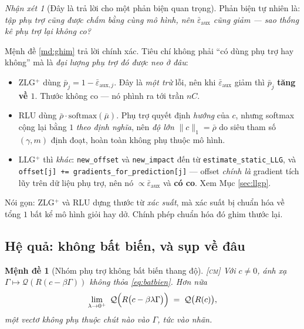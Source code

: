 \documentclass[11pt,a4paper]{article}
\newtheorem{menhde}[dinhly]{Mệnh đề}
\theoremstyle{remark}
\newtheorem{nhanxet}[dinhly]{Nhận xét}
\newcommand{\quant}{\mathcal{Q}}
\newcommand{\epsaux}{\bar\varepsilon_{\mathrm{aux}}}
\newcommand{\code}[1]{\texttt{\small #1}}
\begin{document}
\begin{nhanxet}[Đây là trả lời cho một phản biện quan trọng]
\label{nx:phanbien}
Phản biện tự nhiên là: \emph{tập phụ trợ cũng được chấm bằng cùng mô hình, nên
$\epsaux$ cũng giảm --- sao thống kê phụ trợ lại không co?}

Mệnh đề \ref{md:ghim} trả lời chính xác. Tiêu chí không phải ``có dùng phụ
trợ hay không'' mà là \emph{đại lượng phụ trợ đó được neo ở đâu}:

\begin{itemize}
\item ZLG$^+$ dùng $\bar p_j=1-\bar\varepsilon_{\mathrm{aux},j}$. Đây là
  \emph{một trừ} lỗi, nên khi $\epsaux$ giảm thì $\bar p_j$ \textbf{tăng về
  $1$}. Thước không co --- nó phình ra tới trần $nC$.
\item RLU dùng $\bar\rho\cdot\mathrm{softmax}(\bar\mu)$. Phụ trợ quyết định
  \emph{hướng} của $c$, nhưng softmax cộng lại bằng $1$ \emph{theo định
  nghĩa}, nên \emph{độ lớn} $\|c\|_1=\bar\rho$ do siêu tham số $(\gamma,m)$
  định đoạt, hoàn toàn không phụ thuộc mô hình.
\item LLG$^+$ thì \emph{khác}: \code{new\_offset} và \code{new\_impact} đến từ
  \code{estimate\_static\_LLG}, và \code{offset[j] += gradients\_for\_prediction[j]}
  --- offset \emph{chính là} gradient tích lũy trên dữ liệu phụ trợ, nên nó
  $\propto\epsaux$ và \textbf{có co}. Xem Mục \ref{sec:llgp}.
\end{itemize}

Nói gọn: ZLG$^+$ và RLU dựng thước từ \emph{xác suất}, mà xác suất bị chuẩn
hóa về tổng $1$ bất kể mô hình giỏi hay dở. Chính phép chuẩn hóa đó ghim
thước lại.
\end{nhanxet}

\subsection{Hệ quả: không bất biến, và sụp về đâu}

\begin{menhde}[Nhóm phụ trợ không bất biến thang độ]
\label{md:khongbatbien}
\textsc{[cm]}\; Với $c\ne 0$, ánh xạ $\Gamma\mapsto\quant(R(c-\beta\Gamma))$
\emph{không} thỏa \eqref{eq:batbien}. Hơn nữa
\begin{equation}
\lim_{\lambda\to0^+}\ \quant\Bigl(R\bigl(c-\beta\lambda\Gamma\bigr)\Bigr)
\;=\; \quant\bigl(R(c)\bigr),
\label{eq:supve}
\end{equation}
một vectơ \emph{không phụ thuộc chút nào} vào $\Gamma$, tức vào nhãn.
\end{menhde}
\end{document}
